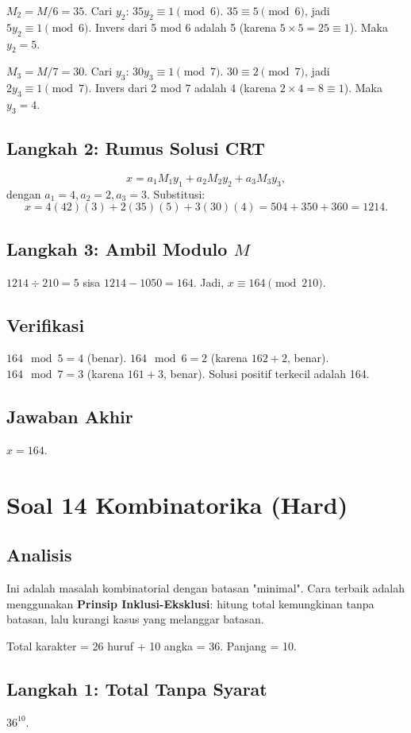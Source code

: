 \documentclass[12pt,a4paper]{article}
\begin{document}
$M_2 = M/6 = 35$. Cari $y_2$: $35 y_2 \equiv 1 \pmod{6}$. $35 \equiv 5 \pmod{6}$, jadi $5y_2 \equiv 1 \pmod{6}$. Invers dari 5 mod 6 adalah 5 (karena $5 \times 5 = 25 \equiv 1$). Maka $y_2 = 5$.

$M_3 = M/7 = 30$. Cari $y_3$: $30 y_3 \equiv 1 \pmod{7}$. $30 \equiv 2 \pmod{7}$, jadi $2y_3 \equiv 1 \pmod{7}$. Invers dari 2 mod 7 adalah 4 (karena $2 \times 4 = 8 \equiv 1$). Maka $y_3 = 4$.

\subsection*{Langkah 2: Rumus Solusi CRT}
\[
x = a_1 M_1 y_1 + a_2 M_2 y_2 + a_3 M_3 y_3,
\]
dengan $a_1=4, a_2=2, a_3=3$.
Substitusi:
\[
x = 4(42)(3) + 2(35)(5) + 3(30)(4) = 504 + 350 + 360 = 1214.
\]

\subsection*{Langkah 3: Ambil Modulo $M$}
$1214 \div 210 = 5$ sisa $1214 - 1050 = 164$.
Jadi, $x \equiv 164 \pmod{210}$.

\subsection*{Verifikasi}
$164 \mod 5 = 4$ (benar). $164 \mod 6 = 2$ (karena $162+2$, benar). $164 \mod 7 = 3$ (karena $161+3$, benar).
Solusi positif terkecil adalah 164.

\subsection*{Jawaban Akhir}
$\boxed{x = 164}$. 

\newpage
\section*{Soal 14 Kombinatorika (Hard)}
\subsection*{Analisis}
Ini adalah masalah kombinatorial dengan batasan "minimal". Cara terbaik adalah menggunakan \textbf{Prinsip Inklusi-Eksklusi}: hitung total kemungkinan tanpa batasan, lalu kurangi kasus yang melanggar batasan.

Total karakter = 26 huruf + 10 angka = 36. Panjang = 10.

\subsection*{Langkah 1: Total Tanpa Syarat}
$36^{10}$.
\end{document}
